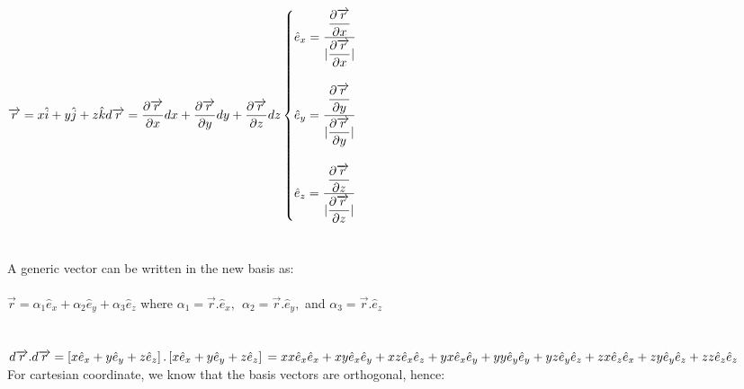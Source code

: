 \documentclass[fleqn]{article}
\begin{document}
\begin{enumerate}
    \textcolor{hwColor}{
      $
        \overrightarrow{r}=x \hat{i}+y\hat{j}+z\hat{k} \\
        \\
        d\overrightarrow{r}=\dfrac{\partial \overrightarrow{r}}{\partial x} dx+\dfrac{\partial \overrightarrow{r}}{\partial y} dy+\dfrac{\partial \overrightarrow{r}}{\partial z}dz \\
        \\
        \begin{cases}
          \hat{e}_x=\dfrac{\dfrac{\partial \overrightarrow{r}}{\partial x}}{|\dfrac{\partial \overrightarrow{r}}{\partial x}|} \\
          \\
          \hat{e}_y=\dfrac{\dfrac{\partial \overrightarrow{r}}{\partial y}}{|\dfrac{\partial \overrightarrow{r}}{\partial y}|}  \\
          \\
          \hat{e}_z=\dfrac{\dfrac{\partial \overrightarrow{r}}{\partial z}}{|\dfrac{\partial \overrightarrow{r}}{\partial z}|}  \\
        \end{cases} \\
        \\
      $
      \\
      \\
      \\
      A generic vector can be written in the new basis as: \\
      \\
      $\overrightarrow{r}=\alpha_1 \hat{e}_x+\alpha_2 \hat{e}_y+\alpha_3 \hat{e}_z$ where $\alpha_1=\overrightarrow{r}.\hat{e}_x, ~~ \alpha_2=\overrightarrow{r}.\hat{e}_y,$ and 
      $\alpha_3=\overrightarrow{r}.\hat{e}_z$
      \\
      \\
      \\
      $
        d\overrightarrow{r}.d\overrightarrow{r}=\left[x \hat{e}_x+y \hat{e}_y+z \hat{e}_z\right].\left[x \hat{e}_x+y \hat{e}_y+z \hat{e}_z\right] \\
        \\
        =xx\hat{e}_x\hat{e}_x+xy \hat{e}_x \hat{e}_y+xz \hat{e}_x \hat{e}_z+yx \hat{e}_x \hat{e}_y+yy\hat{e}_y \hat{e}_y+yz \hat{e}_y \hat{e}_z+zx \hat{e}_z \hat{e}_x+zy \hat{e}_y \hat{e}_z+zz \hat{e}_z \hat{e}_z
      $
      \\
      For cartesian coordinate, we know that the basis vectors are orthogonal, hence: \\
}
\end{enumerate}
\end{document}
